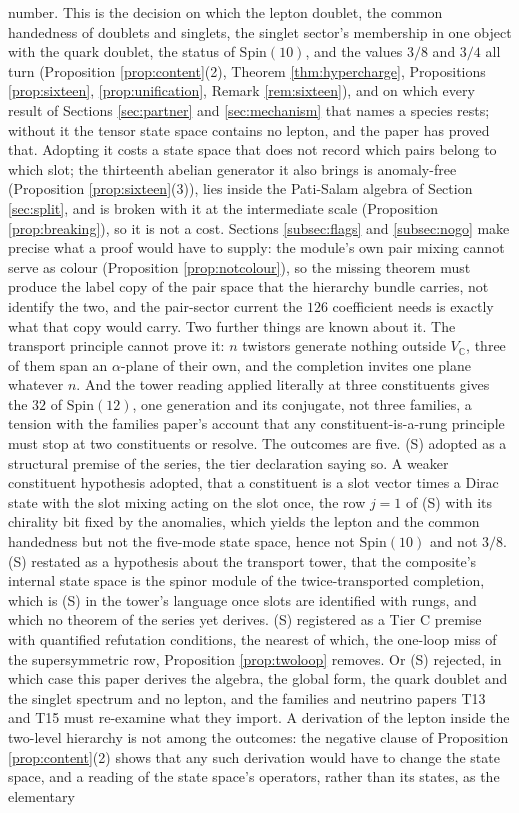 \documentclass[11pt]{article}
\theoremstyle{definition}
\newcommand{\C}{\mathbb{C}}
\begin{document}
number. This is the decision on which the lepton doublet, the common handedness of doublets and singlets, the singlet sector's membership in one object with the quark doublet, the status of $\mathrm{Spin}(10)$, and the values $3/8$ and $3/4$ all turn (Proposition \ref{prop:content}(2), Theorem \ref{thm:hypercharge}, Propositions \ref{prop:sixteen}, \ref{prop:unification}, Remark \ref{rem:sixteen}), and on which every result of Sections \ref{sec:partner} and \ref{sec:mechanism} that names a species rests; without it the tensor state space contains no lepton, and the paper has proved that. Adopting it costs a state space that does not record which pairs belong to which slot; the thirteenth abelian generator it also brings is anomaly-free (Proposition \ref{prop:sixteen}(3)), lies inside the Pati-Salam algebra of Section \ref{sec:split}, and is broken with it at the intermediate scale (Proposition \ref{prop:breaking}), so it is not a cost. Sections \ref{subsec:flags} and \ref{subsec:nogo} make precise what a proof would have to supply: the module's own pair mixing cannot serve as colour (Proposition \ref{prop:notcolour}), so the missing theorem must produce the label copy of the pair space that the hierarchy bundle carries, not identify the two, and the pair-sector current the $126$ coefficient needs is exactly what that copy would carry. Two further things are known about it. The transport principle cannot prove it: $n$ twistors generate nothing outside $V_{\C}$, three of them span an $\alpha$-plane of their own, and the completion invites one plane whatever $n$. And the tower reading applied literally at three constituents gives the $32$ of $\mathrm{Spin}(12)$, one generation and its conjugate, not three families, a tension with the families paper's account that any constituent-is-a-rung principle must stop at two constituents or resolve. The outcomes are five. (S) adopted as a structural premise of the series, the tier declaration saying so. A weaker constituent hypothesis adopted, that a constituent is a slot vector times a Dirac state with the slot mixing acting on the slot once, the row $j = 1$ of (S) with its chirality bit fixed by the anomalies, which yields the lepton and the common handedness but not the five-mode state space, hence not $\mathrm{Spin}(10)$ and not $3/8$. (S) restated as a hypothesis about the transport tower, that the composite's internal state space is the spinor module of the twice-transported completion, which is (S) in the tower's language once slots are identified with rungs, and which no theorem of the series yet derives. (S) registered as a Tier C premise with quantified refutation conditions, the nearest of which, the one-loop miss of the supersymmetric row, Proposition \ref{prop:twoloop} removes. Or (S) rejected, in which case this paper derives the algebra, the global form, the quark doublet and the singlet spectrum and no lepton, and the families and neutrino papers T13 \cite{ButlerT13} and T15 \cite{ButlerT15} must re-examine what they import. A derivation of the lepton inside the two-level hierarchy is not among the outcomes: the negative clause of Proposition \ref{prop:content}(2) shows that any such derivation would have to change the state space, and a reading of the state space's operators, rather than its states, as the elementary 
\end{document}

